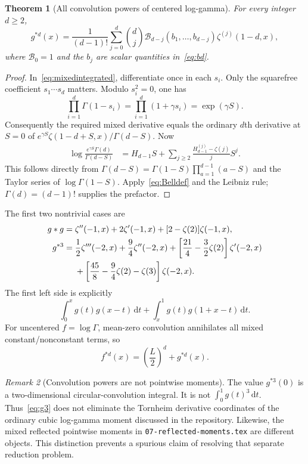 \documentclass[11pt]{article}
\numberwithin{equation}{section}
\newtheorem{theorem}{Theorem}[section]
\theoremstyle{definition}
\theoremstyle{remark}
\newtheorem{remark}[theorem]{Remark}
\newcommand{\dd}{\,\mathrm d}
\newcommand{\cB}{\mathcal B}
\begin{document}
\begin{theorem}[All convolution powers of centered log-gamma]\label{thm:gammapowers}
For every integer $d\ge2$,
\begin{equation}\label{eq:gammapowers}
 g^{*d}(x)=\frac1{(d-1)!}\sum_{j=0}^d\binom dj
       \cB_{d-j}(b_1,\ldots,b_{d-j})\zeta^{(j)}(1-d,x),
\end{equation}
where $\cB_0=1$ and the $b_j$ are scalar quantities in~\eqref{eq:bd}.
\end{theorem}
\begin{proof}
In~\eqref{eq:mixedintegrated}, differentiate once in each $s_i$.
Only the squarefree coefficient $s_1\cdots s_d$ matters. Modulo
$s_i^2=0$, one has
\[
 \prod_{i=1}^d\Gamma(1-s_i)
 =\prod_{i=1}^d(1+\gamma s_i)
 =\exp(\gamma S).
\]
Consequently the required mixed derivative equals the ordinary $d$th
derivative at $S=0$ of
$e^{\gamma S}\zeta(1-d+S,x)/\Gamma(d-S)$. Now
\begin{align*}
 \log\frac{e^{\gamma S}\Gamma(d)}{\Gamma(d-S)}
 &=H_{d-1}S+
   \sum_{j\ge2}\frac{H_{d-1}^{(j)}-\zeta(j)}jS^j.
\end{align*}
This follows directly from
$\Gamma(d-S)=\Gamma(1-S)\prod_{a=1}^{d-1}(a-S)$ and the Taylor series
of $\log\Gamma(1-S)$. Apply~\eqref{eq:Belldef} and the Leibniz rule;
$\Gamma(d)=(d-1)!$ supplies the prefactor.
\end{proof}

The first two nontrivial cases are
\begin{align}
 g*g={}&\zeta''(-1,x)+2\zeta'(-1,x)
                   +[2-\zeta(2)]\zeta(-1,x),\label{eq:g2}\\
 g^{*3}={}&\frac12\zeta'''(-2,x)+\frac94\zeta''(-2,x)
       +\left[\frac{21}4-\frac32\zeta(2)\right]\zeta'(-2,x)
       \label{eq:g3}\\
 &+\left[\frac{45}8-\frac94\zeta(2)-\zeta(3)\right]\zeta(-2,x).
 \notag
\end{align}
The first left side is explicitly
\[
 \int_0^xg(t)g(x-t)\dd t+\int_x^1g(t)g(1+x-t)\dd t.
\]
For uncentered $f=\log\Gamma$, mean-zero convolution annihilates all
mixed constant/nonconstant terms, so
\begin{equation}\label{eq:uncentered}
 f^{*d}(x)=\left(\frac L2\right)^d+g^{*d}(x).
\end{equation}

\begin{remark}[Convolution powers are not pointwise moments]
The value $g^{*3}(0)$ is a two-dimensional circular-convolution integral.
It is not $\int_0^1g(t)^3\dd t$. Thus~\eqref{eq:g3} does not eliminate
the Tornheim derivative coordinates of the ordinary cubic log-gamma
moment discussed in the repository. Likewise, the mixed reflected
pointwise moments in \texttt{07-reflected-moments.tex} are different
objects. This distinction prevents a spurious claim of resolving that
separate reduction problem.
\end{remark}
\end{document}
